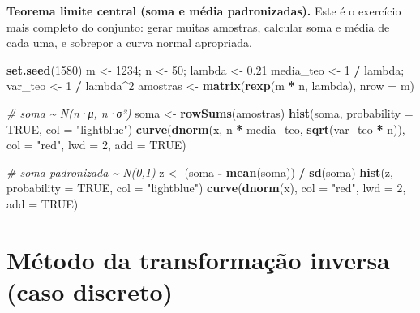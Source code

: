\documentclass[
  portuguese,
  11pt,
  openany]{book}
\newenvironment{Shaded}{\begin{snugshade}}{\end{snugshade}}
\newcommand{\AttributeTok}[1]{\textcolor[rgb]{0.13,0.29,0.53}{#1}}
\newcommand{\CommentTok}[1]{\textcolor[rgb]{0.56,0.35,0.01}{\textit{#1}}}
\newcommand{\ConstantTok}[1]{\textcolor[rgb]{0.56,0.35,0.01}{#1}}
\newcommand{\DecValTok}[1]{\textcolor[rgb]{0.00,0.00,0.81}{#1}}
\newcommand{\FloatTok}[1]{\textcolor[rgb]{0.00,0.00,0.81}{#1}}
\newcommand{\FunctionTok}[1]{\textcolor[rgb]{0.13,0.29,0.53}{\textbf{#1}}}
\newcommand{\NormalTok}[1]{#1}
\newcommand{\OtherTok}[1]{\textcolor[rgb]{0.56,0.35,0.01}{#1}}
\newcommand{\SpecialCharTok}[1]{\textcolor[rgb]{0.81,0.36,0.00}{\textbf{#1}}}
\newcommand{\StringTok}[1]{\textcolor[rgb]{0.31,0.60,0.02}{#1}}
\begin{document}
\textbf{Teorema limite central (soma e média padronizadas).} Este é o exercício mais
completo do conjunto: gerar muitas amostras, calcular soma e média de cada uma, e
sobrepor a curva normal apropriada.

\begin{Shaded}
\begin{Highlighting}[]
\FunctionTok{set.seed}\NormalTok{(}\DecValTok{1580}\NormalTok{)}
\NormalTok{m }\OtherTok{\textless{}{-}} \DecValTok{1234}\NormalTok{; n }\OtherTok{\textless{}{-}} \DecValTok{50}\NormalTok{; lambda }\OtherTok{\textless{}{-}} \FloatTok{0.21}
\NormalTok{media\_teo }\OtherTok{\textless{}{-}} \DecValTok{1} \SpecialCharTok{/}\NormalTok{ lambda; var\_teo }\OtherTok{\textless{}{-}} \DecValTok{1} \SpecialCharTok{/}\NormalTok{ lambda}\SpecialCharTok{\^{}}\DecValTok{2}
\NormalTok{amostras }\OtherTok{\textless{}{-}} \FunctionTok{matrix}\NormalTok{(}\FunctionTok{rexp}\NormalTok{(m }\SpecialCharTok{*}\NormalTok{ n, lambda), }\AttributeTok{nrow =}\NormalTok{ m)}

\CommentTok{\# soma \textasciitilde{} N(n·μ, n·σ²)}
\NormalTok{soma }\OtherTok{\textless{}{-}} \FunctionTok{rowSums}\NormalTok{(amostras)}
\FunctionTok{hist}\NormalTok{(soma, }\AttributeTok{probability =} \ConstantTok{TRUE}\NormalTok{, }\AttributeTok{col =} \StringTok{"lightblue"}\NormalTok{)}
\FunctionTok{curve}\NormalTok{(}\FunctionTok{dnorm}\NormalTok{(x, n }\SpecialCharTok{*}\NormalTok{ media\_teo, }\FunctionTok{sqrt}\NormalTok{(var\_teo }\SpecialCharTok{*}\NormalTok{ n)), }\AttributeTok{col =} \StringTok{"red"}\NormalTok{, }\AttributeTok{lwd =} \DecValTok{2}\NormalTok{, }\AttributeTok{add =} \ConstantTok{TRUE}\NormalTok{)}

\CommentTok{\# soma padronizada \textasciitilde{} N(0,1)}
\NormalTok{z }\OtherTok{\textless{}{-}}\NormalTok{ (soma }\SpecialCharTok{{-}} \FunctionTok{mean}\NormalTok{(soma)) }\SpecialCharTok{/} \FunctionTok{sd}\NormalTok{(soma)}
\FunctionTok{hist}\NormalTok{(z, }\AttributeTok{probability =} \ConstantTok{TRUE}\NormalTok{, }\AttributeTok{col =} \StringTok{"lightblue"}\NormalTok{)}
\FunctionTok{curve}\NormalTok{(}\FunctionTok{dnorm}\NormalTok{(x), }\AttributeTok{col =} \StringTok{"red"}\NormalTok{, }\AttributeTok{lwd =} \DecValTok{2}\NormalTok{, }\AttributeTok{add =} \ConstantTok{TRUE}\NormalTok{)}
\end{Highlighting}
\end{Shaded}

\section{Método da transformação inversa (caso discreto)}\label{muxe9todo-da-transformauxe7uxe3o-inversa-caso-discreto}
\end{document}
